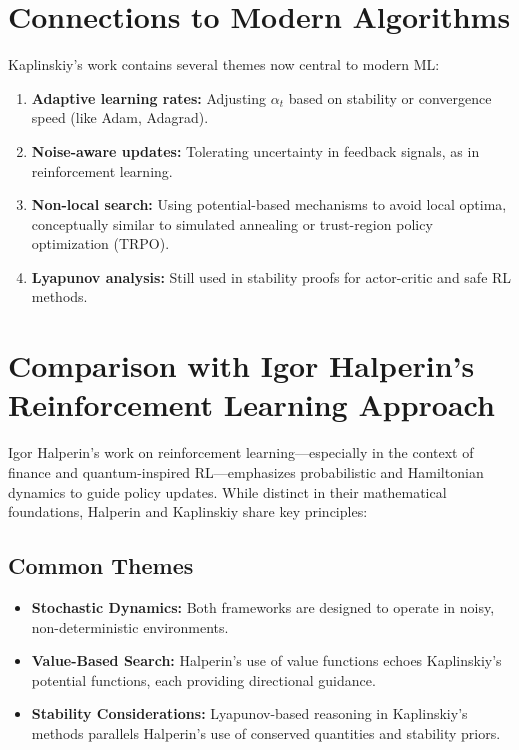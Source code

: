 \documentclass[12pt]{article}
\begin{document}
\section{Connections to Modern Algorithms}
Kaplinskiy's work contains several themes now central to modern ML:
\begin{enumerate}[label=\arabic*.]
\item \textbf{Adaptive learning rates:} Adjusting $\alpha_t$ based on stability or convergence speed (like Adam, Adagrad).
\item \textbf{Noise-aware updates:} Tolerating uncertainty in feedback signals, as in reinforcement learning.
\item \textbf{Non-local search:} Using potential-based mechanisms to avoid local optima, conceptually similar to simulated annealing or trust-region policy optimization (TRPO).
\item \textbf{Lyapunov analysis:} Still used in stability proofs for actor-critic and safe RL methods.
\end{enumerate}

\section{Comparison with Igor Halperin's Reinforcement Learning Approach}
Igor Halperin's work on reinforcement learning—especially in the context of finance and quantum-inspired RL—emphasizes probabilistic and Hamiltonian dynamics to guide policy updates. While distinct in their mathematical foundations, Halperin and Kaplinskiy share key principles:

\subsection*{Common Themes}
\begin{itemize}
\item \textbf{Stochastic Dynamics:} Both frameworks are designed to operate in noisy, non-deterministic environments.
\item \textbf{Value-Based Search:} Halperin's use of value functions echoes Kaplinskiy's potential functions, each providing directional guidance.
\item \textbf{Stability Considerations:} Lyapunov-based reasoning in Kaplinskiy's methods parallels Halperin's use of conserved quantities and stability priors.
\end{itemize}
\end{document}
